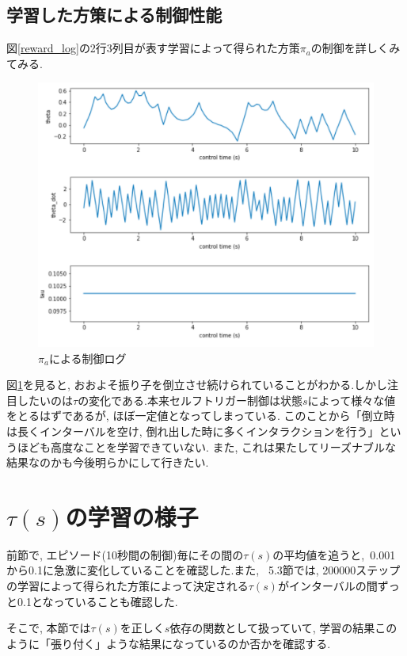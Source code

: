 \documentclass{jsarticle}
\begin{document}
\subsection{学習した方策による制御性能}
図\ref{reward_log}の2行3列目が表す学習によって得られた方策$\pi_a$の制御を詳しくみてみる. \par
\begin{figure}[h]
	\centering
 	\includegraphics[width=14cm]{control_log.png}
 	\caption{$\pi_a$による制御ログ} \label{control_log}
\end{figure}
図\ref{control_log}を見ると, おおよそ振り子を倒立させ続けられていることがわかる.しかし注目したいのは$\tau$の変化である.本来セルフトリガー制御は状態$s$によって様々な値をとるはずであるが, 
ほぼ一定値となってしまっている. このことから「倒立時は長くインターバルを空け, 倒れ出した時に多くインタラクションを行う」というほども高度なことを学習できていない. また, これは果たしてリーズナブルな結果なのかも今後明らかにして行きたい.

\section{$\tau(s)$の学習の様子}
前節で, エピソード(10秒間の制御)毎にその間の$\tau(s)$の平均値を追うと,~0.001から0.1に急激に変化していることを確認した.また, ~5.3節では, 200000ステップの学習によって得られた方策によって決定される$\tau(s)$がインターバルの間ずっと0.1となっていることも確認した. \par
そこで, 本節では$\tau(s)$を正しく$s$依存の関数として扱っていて, 学習の結果このように「張り付く」ような結果になっているのか否かを確認する. 
\end{document}
